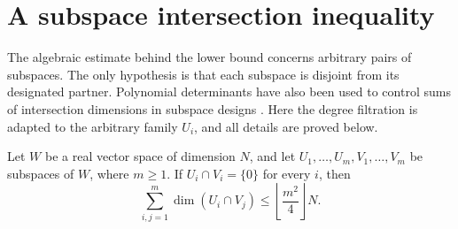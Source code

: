 \section{A subspace intersection inequality}
\label{sec:subspaces}

The algebraic estimate behind the lower bound concerns arbitrary pairs of
subspaces.  The only hypothesis is that each subspace is disjoint from its
designated partner. Polynomial determinants have also been used to
control sums of intersection dimensions in subspace designs
\cite{GuruswamiKopparty2016}. Here the degree filtration is adapted
to the arbitrary family $U_i$, and all details are proved below.

\begin{lemma}
\label{lem:subspace}
Let $W$ be a real vector space of dimension $N$, and let
$U_1,\ldots,U_m,V_1,\ldots,V_m$ be subspaces of $W$, where $m\geq1$.
If $U_i\cap V_i=\{0\}$ for every $i$, then
\begin{equation}
\label{eq:subspace-bound}
  \sum_{i,j=1}^{m}\dim(U_i\cap V_j)
  \leq \left\lfloor\frac{m^2}{4}\right\rfloor N.
\end{equation}
\end{lemma}

